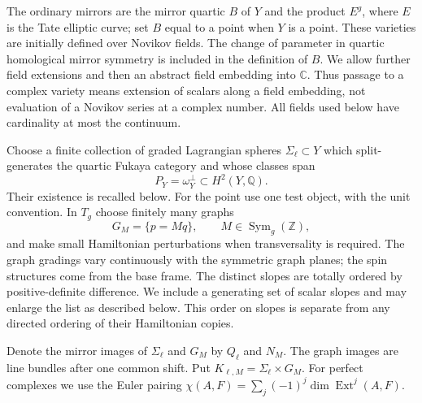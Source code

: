 \documentclass[11pt]{article}
\numberwithin{equation}{section}
\theoremstyle{definition}
\theoremstyle{remark}
\newcommand{\Q}{\mathbb Q}
\newcommand{\C}{\mathbb C}
\newcommand{\Z}{\mathbb Z}
\DeclareMathOperator{\Ext}{Ext}
\begin{document}
The ordinary mirrors are the mirror quartic $B$ of $Y$ and the product
$E^g$, where $E$ is the Tate elliptic curve; set $B$ equal to a point
when $Y$ is a point.  These varieties are initially
defined over Novikov fields.  The change of parameter in quartic
homological mirror symmetry is included in the definition of $B$.
We allow further field extensions and then an abstract field embedding
into $\C$.  Thus passage to a complex variety means extension of scalars
along a field embedding, not evaluation of a Novikov series at a complex
number.  All fields used below have cardinality at most the continuum.

Choose a finite collection of graded Lagrangian spheres $\Sigma_\ell\subset Y$
which split-generates the quartic Fukaya category and whose classes span
\begin{equation}
 P_Y=\omega_Y^\perp\subset H^2(Y,\Q).
 \label{setup:primitive-space}
\end{equation}
Their existence is recalled below.  For the point use one test object,
with the unit convention.  In $T_g$ choose finitely many graphs
\begin{equation}
 G_M=\{p=Mq\},\qquad M\in\operatorname{Sym}_g(\Z),
 \label{setup:graphs}
\end{equation}
and make small Hamiltonian perturbations when transversality is required.
The graph gradings vary continuously with the symmetric graph planes;
the spin structures come from the base frame.  The distinct slopes are
totally ordered by positive-definite difference.  We include a generating
set of scalar slopes and may enlarge the list as described below.
This order on slopes is separate from any directed ordering of their
Hamiltonian copies.

Denote the mirror images of $\Sigma_\ell$ and $G_M$ by $Q_\ell$ and $N_M$.
The graph images are line bundles after one common shift.  Put
$K_{\ell,M}=\Sigma_\ell\times G_M$.  For perfect complexes we use the Euler
pairing
$\chi(A,F)=\sum_j(-1)^j\dim\Ext^j(A,F)$.
\end{document}
